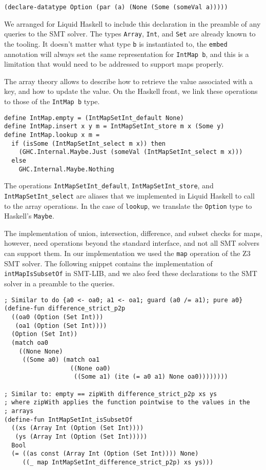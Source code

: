 \documentclass[sigconf, anonymous, review]{acmart}
\newcommand{\tc}[1]{{\small\texttt{#1}}}
\begin{document}
\begin{verbatim}
(declare-datatype Option (par (a) (None (Some (someVal a)))))
\end{verbatim}

We arranged for Liquid Haskell to include this declaration in the preamble of any
queries to the SMT solver. The types \tc{Array}, \tc{Int}, and \tc{Set} are already
known to the tooling.
It doesn't matter what type \tc{b} is instantiated to, the \tc{embed} annotation will
always set the same representation for \tc{IntMap b}, and this is a limitation that
would need to be addressed to support maps properly.

The array theory allows to describe how to retrieve the value associated with
a key, and how to update the value. On the Haskell front, we link these operations
to those of the \tc{IntMap b} type.

\begin{verbatim}
define IntMap.empty = (IntMapSetInt_default None)
define IntMap.insert x y m = IntMapSetInt_store m x (Some y)
define IntMap.lookup x m =
  if (isSome (IntMapSetInt_select m x)) then
    (GHC.Internal.Maybe.Just (someVal (IntMapSetInt_select m x)))
  else
    GHC.Internal.Maybe.Nothing
\end{verbatim}

The operations \tc{IntMapSetInt\_default}, \tc{IntMapSetInt\_store}, and \tc{IntMapSetInt\_select}
are aliases that we implemented in Liquid Haskell to call to the array operations.
In the case of \tc{lookup}, we translate the \tc{Option} type to Haskell's \tc{Maybe}.

The implementation of union, intersection,
difference, and subset checks for maps, however,
need operations beyond the standard interface, and not all SMT solvers can support
them. In our implementation we used the \tc{map} operation of the
Z3 SMT solver. The following snippet contains the implementation of
\tc{intMapIsSubsetOf} in SMT-LIB, and we also feed these declarations to the
SMT solver in a preamble to the queries.

\begin{verbatim}
; Similar to do {a0 <- oa0; a1 <- oa1; guard (a0 /= a1); pure a0}
(define-fun difference_strict_p2p
  ((oa0 (Option (Set Int)))
   (oa1 (Option (Set Int))))
  (Option (Set Int))
  (match oa0
    ((None None)
     ((Some a0) (match oa1
                  ((None oa0)
                   ((Some a1) (ite (= a0 a1) None oa0))))))))

; Similar to: empty == zipWith difference_strict_p2p xs ys
; where zipWith applies the function pointwise to the values in the
; arrays
(define-fun IntMapSetInt_isSubsetOf
  ((xs (Array Int (Option (Set Int))))
   (ys (Array Int (Option (Set Int)))))
  Bool
  (= ((as const (Array Int (Option (Set Int)))) None)
     ((_ map IntMapSetInt_difference_strict_p2p) xs ys)))
\end{verbatim}
\end{document}
